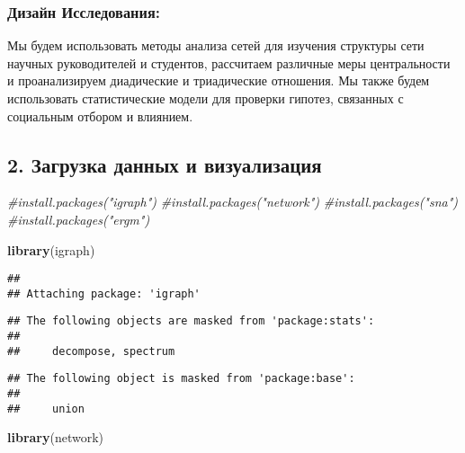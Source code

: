 \documentclass[
]{article}
\newenvironment{Shaded}{\begin{snugshade}}{\end{snugshade}}
\newcommand{\CommentTok}[1]{\textcolor[rgb]{0.56,0.35,0.01}{\textit{#1}}}
\newcommand{\FunctionTok}[1]{\textcolor[rgb]{0.13,0.29,0.53}{\textbf{#1}}}
\newcommand{\NormalTok}[1]{#1}
\begin{document}
\hypertarget{ux434ux438ux437ux430ux439ux43d-ux438ux441ux441ux43bux435ux434ux43eux432ux430ux43dux438ux44f}{%
\subsubsection{Дизайн
Исследования:}\label{ux434ux438ux437ux430ux439ux43d-ux438ux441ux441ux43bux435ux434ux43eux432ux430ux43dux438ux44f}}

Мы будем использовать методы анализа сетей для изучения структуры сети
научных руководителей и студентов, рассчитаем различные меры
центральности и проанализируем диадические и триадические отношения. Мы
также будем использовать статистические модели для проверки гипотез,
связанных с социальным отбором и влиянием.

\hypertarget{ux437ux430ux433ux440ux443ux437ux43aux430-ux434ux430ux43dux43dux44bux445-ux438-ux432ux438ux437ux443ux430ux43bux438ux437ux430ux446ux438ux44f}{%
\subsection{2. Загрузка данных и
визуализация}\label{ux437ux430ux433ux440ux443ux437ux43aux430-ux434ux430ux43dux43dux44bux445-ux438-ux432ux438ux437ux443ux430ux43bux438ux437ux430ux446ux438ux44f}}

\begin{Shaded}
\begin{Highlighting}[]
\CommentTok{\#install.packages("igraph")}
\CommentTok{\#install.packages("network")}
\CommentTok{\#install.packages("sna")}
\CommentTok{\#install.packages("ergm")}

\FunctionTok{library}\NormalTok{(igraph)}
\end{Highlighting}
\end{Shaded}

\begin{verbatim}
## 
## Attaching package: 'igraph'
\end{verbatim}

\begin{verbatim}
## The following objects are masked from 'package:stats':
## 
##     decompose, spectrum
\end{verbatim}

\begin{verbatim}
## The following object is masked from 'package:base':
## 
##     union
\end{verbatim}

\begin{Shaded}
\begin{Highlighting}[]
\FunctionTok{library}\NormalTok{(network)}
\end{Highlighting}
\end{Shaded}
\end{document}

